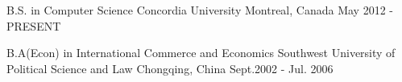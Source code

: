 \documentclass[11pt, a4paper]{awesome-cv} %
\begin{document}
\makecvheader %





\begin{cventries}
	
	
	\cventry
	{B.S. in Computer Science} %
	{Concordia University} %
	{Montreal, Canada} %
	{May 2012 - PRESENT} %
	{ %
	}
	
	

	\cventry
	{B.A(Econ) in International Commerce and Economics} %
	{Southwest University of Political Science and Law} %
	{Chongqing, China} %
	{Sept.2002 - Jul. 2006 } %
	{
	}
	
	
\end{cventries}




\end{document}
